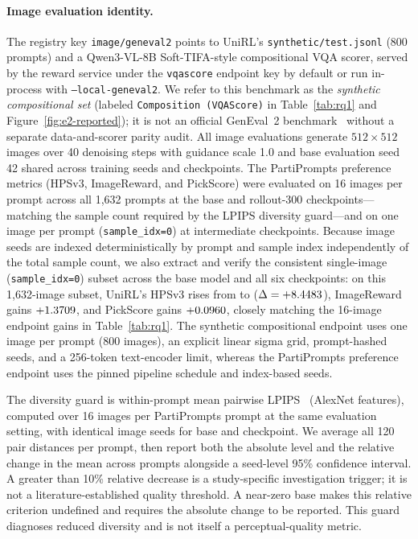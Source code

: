 \documentclass[10pt]{article}
\begin{document}
\paragraph{Image evaluation identity.}
The registry key \texttt{image/geneval2} points to UniRL's \texttt{synthetic/test.jsonl} (800 prompts) and a Qwen3-VL-8B Soft-TIFA-style compositional VQA scorer, served by the reward service under the \texttt{vqascore} endpoint key by default or run in-process with \texttt{--local-geneval2}.
We refer to this benchmark as the \emph{synthetic compositional set} (labeled \texttt{Composition (VQAScore)} in Table~\ref{tab:rq1} and Figure~\ref{fig:e2-reported}); it is not an official GenEval~2 benchmark~\citep{kamath2025geneval2} without a separate data-and-scorer parity audit.
All image evaluations generate $512\times512$ images over 40 denoising steps with guidance scale 1.0 and base evaluation seed 42 shared across training seeds and checkpoints.
The PartiPrompts preference metrics (HPSv3, ImageReward, and PickScore) were evaluated on 16 images per prompt across all 1,632 prompts at the base and rollout-300 checkpoints---matching the sample count required by the LPIPS diversity guard---and on one image per prompt (\texttt{sample\_idx=0}) at intermediate checkpoints.
Because image seeds are indexed deterministically by prompt and sample index independently of the total sample count, we also extract and verify the consistent single-image (\texttt{sample\_idx=0}) subset across the base model and all six checkpoints: on this 1,632-image subset, UniRL's HPSv3 rises from \ETwoHPSOneImgBase{} to \ETwoHPSOneImgEnd{} ($\Delta = +8.4483{}$), ImageReward gains $+1.3709{}$, and PickScore gains $+0.0960{}$, closely matching the 16-image endpoint gains in Table~\ref{tab:rq1}.
The synthetic compositional endpoint uses one image per prompt (800 images), an explicit linear sigma grid, prompt-hashed seeds, and a 256-token text-encoder limit, whereas the PartiPrompts preference endpoint uses the pinned pipeline schedule and index-based seeds.

The diversity guard is within-prompt mean pairwise LPIPS~\citep{zhang2018lpips} (AlexNet features), computed over 16 images per PartiPrompts prompt at the same evaluation setting, with identical image seeds for base and checkpoint.
We average all 120 pair distances per prompt, then report both the absolute level and the relative change in the mean across prompts alongside a seed-level 95\% confidence interval.
A greater than 10\% relative decrease is a study-specific investigation trigger; it is not a literature-established quality threshold. A near-zero base makes this relative criterion undefined and requires the absolute change to be reported.
This guard diagnoses reduced diversity and is not itself a perceptual-quality metric.
\end{document}
